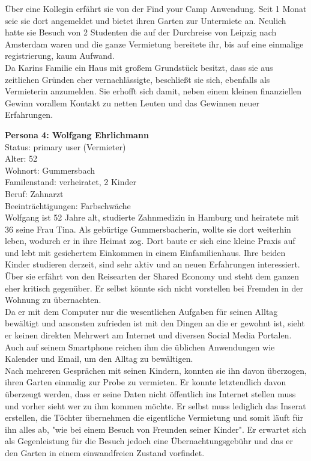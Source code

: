 Über eine Kollegin erfährt sie von der Find your Camp Anwendung. Seit 1 Monat seie sie dort angemeldet und bietet ihren Garten zur Untermiete an. Neulich hatte sie Besuch von 2 Studenten die auf der Durchreise von Leipzig nach Amsterdam waren und die ganze Vermietung bereitete ihr, bis auf eine einmalige registrierung, kaum Aufwand.\\

Da Karins Familie ein Haus mit großem Grundstück besitzt, dass sie aus zeitlichen Gründen eher vernachlässigte, beschließt sie sich, ebenfalls als Vermieterin anzumelden. Sie erhofft sich damit, neben einem kleinen finanziellen Gewinn vorallem Kontakt zu netten Leuten und das Gewinnen neuer Erfahrungen.

\newpage
\textbf{Persona 4: Wolfgang Ehrlichmann}\\
Status: primary user (Vermieter)\\

Alter: 52\\
Wohnort: Gummersbach\\
Familenstand: verheiratet, 2 Kinder\\
Beruf: Zahnarzt\\
Beeinträchtigungen: Farbschwäche\\

Wolfgang ist 52 Jahre alt, studierte Zahnmedizin in Hamburg und heiratete mit 36 seine Frau Tina. Als gebürtige Gummersbacherin, wollte sie dort weiterhin leben, wodurch er in ihre Heimat zog.
Dort baute er sich eine kleine Praxis auf und lebt mit gesichertem Einkommen in einem Einfamilienhaus. Ihre beiden Kinder studieren derzeit, sind sehr aktiv und an neuen Erfahrungen interessiert.
Über sie erfährt von den Reisearten der Shared Economy und steht dem ganzen eher kritisch gegenüber. Er selbst könnte sich nicht vorstellen bei Fremden in der Wohnung zu übernachten. \\
Da er mit dem Computer nur die wesentlichen Aufgaben für seinen Alltag bewältigt und ansonsten zufrieden ist mit den Dingen an die er gewohnt ist, sieht er keinen direkten Mehrwert am Internet und diversen Social Media Portalen.
Auch auf seinem Smartphone reichen ihm die üblichen Anwendungen wie Kalender und Email, um den Alltag zu bewältigen.\\

Nach mehreren Gesprächen mit seinen Kindern, konnten sie ihn davon überzogen, ihren Garten einmalig zur Probe zu vermieten. Er konnte letztendlich davon überzeugt werden, dass er seine Daten nicht öffentlich ins Internet stellen muss und vorher sieht wer zu ihm kommen möchte. Er selbst muss lediglich das Inserat erstellen, die Töchter übernehmen die eigentliche Vermietung und somit läuft für ihn alles ab, "wie bei einem Besuch von Freunden seiner Kinder".
Er erwartet sich als Gegenleistung für die Besuch jedoch eine Übernachtungsgebühr und das er den Garten in einem einwandfreien Zustand vorfindet.

